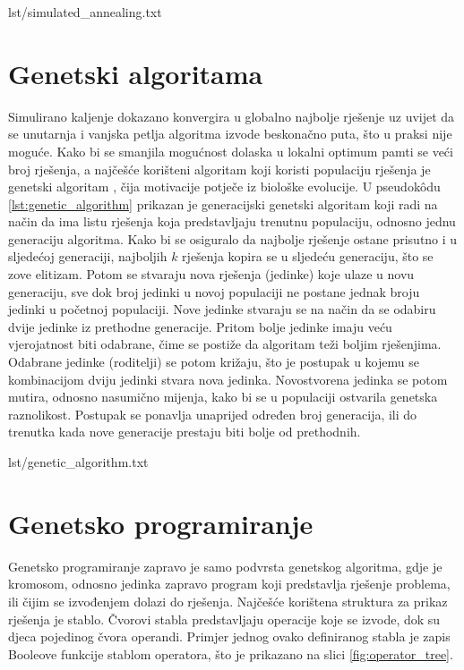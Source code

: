 \begin{minipage}{0.95\textwidth}
     {lst/simulated_annealing.txt}
\end{minipage}


\section{Genetski algoritama}
Simulirano kaljenje dokazano konvergira u globalno najbolje rješenje uz uvijet da se unutarnja i vanjska petlja algoritma izvode beskonačno puta, što u praksi nije moguće.
Kako bi se smanjila mogućnost dolaska u lokalni optimum pamti se veći broj rješenja, a najčešće korišteni algoritam koji koristi populaciju rješenja je genetski algoritam \cite{PrirodomInspirirani}, čija motivacije potječe iz biološke evolucije.
U pseudok\^{o}du \ref{lst:genetic_algorithm} prikazan je generacijski genetski algoritam koji radi na način da ima listu rješenja koja predstavljaju trenutnu populaciju, odnosno jednu generaciju algoritma.
Kako bi se osiguralo da najbolje rješenje ostane prisutno i u sljedećoj generaciji, najboljih $k$ rješenja kopira se u sljedeću generaciju, što se zove elitizam. 
Potom se stvaraju nova rješenja (jedinke) koje ulaze u novu generaciju, sve dok broj jedinki u novoj populaciji ne postane jednak broju jedinki u početnoj populaciji. 
Nove jedinke stvaraju se na način da se odabiru dvije jedinke iz prethodne generacije.
Pritom bolje jedinke imaju veću vjerojatnost biti odabrane, čime se postiže da algoritam teži boljim rješenjima.
Odabrane jedinke (roditelji) se potom križaju, što je postupak u kojemu se kombinacijom dviju jedinki stvara nova jedinka.
Novostvorena jedinka se potom mutira, odnosno nasumično mijenja, kako bi se u populaciji ostvarila genetska raznolikost.
Postupak se ponavlja unaprijed određen broj generacija, ili do trenutka kada nove generacije prestaju biti bolje od prethodnih.

\begin{minipage}{0.95\textwidth}
     {lst/genetic_algorithm.txt}
\end{minipage}


\section{Genetsko programiranje}
Genetsko programiranje \cite{koza1992genetic} zapravo je samo podvrsta genetskog algoritma, gdje je kromosom, odnosno jedinka zapravo program koji predstavlja rješenje problema, ili čijim se izvođenjem dolazi do rješenja.
Najčešće korištena struktura za prikaz rješenja je stablo. 
Čvorovi stabla predstavljaju operacije koje se izvode, dok su djeca pojedinog čvora operandi.
Primjer jednog ovako definiranog stabla je zapis Booleove funkcije stablom operatora, što je prikazano na slici \ref{fig:operator_tree}.
